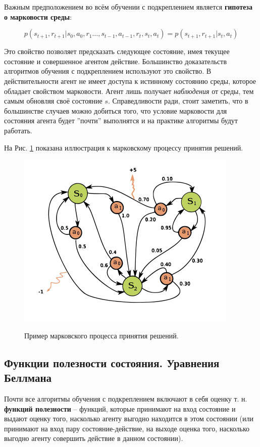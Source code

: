 \documentclass[12pt,a4paper]{amsart}
\begin{document}
Важным предположением во всём обучении с подкреплением является \textbf{гипотеза о марковости среды}:

\begin{equation} \label{eq:rl-markov-property}
p(s_{t+1}, r_{t+1}|s_0, a_0, r_1 \dots, s_{t-1}, a_{t-1}, r_t, s_t, a_t) = p(s_{t+1}, r_{t+1} | s_t, a_t)
\end{equation}

Это свойство позволяет предсказать следующее состояние, имея текущее состояние и совершенное агентом действие. Большинство доказательств алгоритмов обучения с подкреплением используют это свойство. В действительности агент не имеет доступа к истинному состоянию среды, которое обладает свойством марковости. Агент лишь получает \textit{наблюдения} от среды, тем самым обновляя своё состояние $s$. Справедливости ради, стоит заметить, что в большинстве случаев можно добиться того, что условие марковости для состояния агента будет ''почти'' выполнятся и на практике алгоритмы будут работать.

На Рис. \ref{fig:mdp} показана иллюстрация к марковскому процессу принятия решений.

\begin{figure}[htbp!]
	\caption{Пример марковского процесса принятия решений.}
	\includegraphics[scale=0.7]{imgs/mdp.png}
	\label{fig:mdp}
	\centering
\end{figure}


\subsection{Функции полезности состояния. Уравнения Беллмана}

Почти все алгоритмы обучения с подкреплением включают в себя оценку т. н. \textbf{функций полезности} -- функций, которые принимают на вход состояние и выдают оценку того, насколько агенту выгодно находится в этом состоянии (или принимают на вход пару состояние-действие, на выходе оценка того, насколько выгодно агенту совершить действие в данном состоянии).
\end{document}
